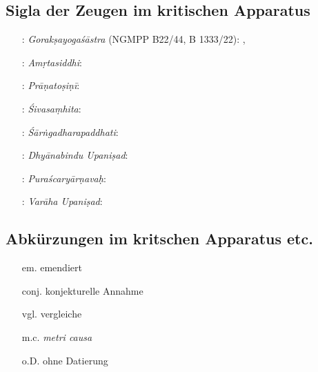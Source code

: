 \documentclass[a4paper,12pt]{article}
\begin{document}
\subsection{Sigla der Zeugen im kritischen Apparatus}
\label{zeugsigla}

\begin{enumerate}
\item[\cite{mscod}:] \textit{Gorakṣayogaśāstra} (NGMPP B22/44, B 1333/22): \textcite{mscodex}, \textcite{mscodex2}
\item[\cite{aswork}:] \textit{Amṛtasiddhi}: \textcite{asiddhi}
\item[\cite{tosini}:] \textit{Prāṇatoṣiṇī}: \textcite{ramatosana} 
\item[\cite{shivasam}:] \textit{Śivasaṃhita}: \textcite{mallinson2007}
\item[\cite{sgpaddhati}:] \textit{Śārṅgadharapaddhati}: \textcite{peterson1888} 
\item[\cite{dbindu}:] \textit{Dhyānabindu Upaniṣad}: \textcite{dhyanabindu} 
\item[\cite{puras}:] \textit{Puraścaryārṇavaḥ}: \textcite{purascaryarnava1901}
\item[\cite{varaha}:] \textit{Varāha Upaniṣad}: \textcite{varahaupanishad}
\end{enumerate}

\subsection{Abkürzungen im kritschen Apparatus etc.}
\begin{enumerate}
\item [em.] emendiert
\item [conj.] konjekturelle Annahme
\item [vgl.] vergleiche
\item [m.c.] \textit{metri causa}
\item [o.D.] ohne Datierung 
\end{enumerate}

\clearpage
\end{document}
